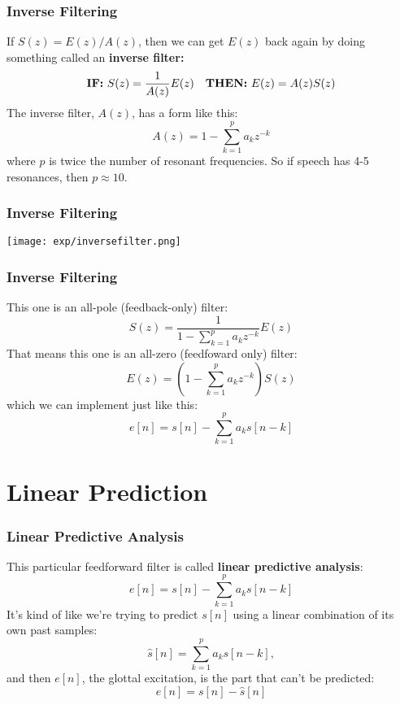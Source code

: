 \documentclass{beamer}
\begin{document}
\begin{frame}
  \frametitle{Inverse Filtering}

  If $S(z) = E(z)/A(z)$, then we can get $E(z)$ back again by doing
  something called an {\bf inverse filter:}
  \begin{displaymath}
    \mbox{\bf IF:}~S(z) = \frac{1}{A(z)}E(z)~~~
    \mbox{\bf THEN:}~E(z) = A(z)S(z)
  \end{displaymath}
  The inverse filter, $A(z)$, has a form like this:
  \begin{displaymath}
    A(z)  = 1 - \sum_{k=1}^p a_k z^{-k}
  \end{displaymath}
  where $p$ is twice the number of resonant frequencies.  So if
  speech has 4-5 resonances, then $p\approx 10$.
\end{frame}

\begin{frame}
  \frametitle{Inverse Filtering}

  \centerline{\texttt{[image: exp/inversefilter.png]}}
\end{frame}

\begin{frame}
  \frametitle{Inverse Filtering}

  This one is an all-pole (feedback-only) filter:
  \begin{displaymath}
    S(z) = \frac{1}{1-\sum_{k=1}^p a_kz^{-k}} E(z)
  \end{displaymath}
  That means this one is an all-zero (feedfoward only) filter:
  \begin{displaymath}
    E(z) = \left(1-\sum_{k=1}^p a_kz^{-k}\right) S(z)
  \end{displaymath}
  which we can implement just like this:
  \begin{displaymath}
    e[n] = s[n] - \sum_{k=1}^p a_k s[n-k]
  \end{displaymath}
\end{frame}

\section[Linear Prediction]{Linear Prediction}
\setcounter{subsection}{1}

\begin{frame}
  \frametitle{Linear Predictive Analysis}

  This particular feedforward filter is called {\bf linear predictive
    analysis}:
  \begin{displaymath}
    e[n] = s[n] - \sum_{k=1}^p a_k s[n-k]
  \end{displaymath}
  It's kind of like we're trying to predict $s[n]$ using a linear
  combination of its own past samples:
  \begin{displaymath}
    \hat{s}[n] = \sum_{k=1}^p a_k s[n-k],
  \end{displaymath}
  and then $e[n]$, the glottal excitation, is the part that can't be
  predicted:
  \begin{displaymath}
    e[n] = s[n] - \hat{s}[n]
  \end{displaymath}
\end{frame}
\end{document}
